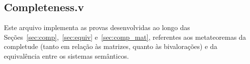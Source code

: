     \subsection{Completeness.v}\label{sec:completeness}
        
        Este arquivo implementa as provas desenvolvidas ao longo das Seções~\ref{sec:comp},~\ref{sec:equiv} e~\ref{sec:comp_mat}, referentes aos metateoremas da completude (tanto em relação às matrizes, quanto às bivalorações) e da equivalência entre os sistemas semânticos.

        
    
    